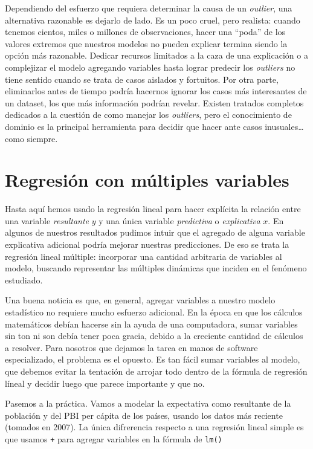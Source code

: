 \documentclass[]{book}
\begin{document}
Dependiendo del esfuerzo que requiera determinar la causa de un
\emph{outlier}, una alternativa razonable es dejarlo de lado. Es un poco
cruel, pero realista: cuando tenemos cientos, miles o millones de
observaciones, hacer una ``poda'' de los valores extremos que nuestros
modelos no pueden explicar termina siendo la opción más razonable.
Dedicar recursos limitados a la caza de una explicación o a complejizar
el modelo agregando variables hasta lograr predecir los \emph{outliers}
no tiene sentido cuando se trata de casos aislados y fortuitos. Por otra
parte, eliminarlos antes de tiempo podría hacernos ignorar los casos más
interesantes de un dataset, los que más información podrían revelar.
Existen tratados completos dedicados a la cuestión de como manejar los
\emph{outliers}, pero el conocimiento de dominio es la principal
herramienta para decidir que hacer ante casos inusuales\ldots{} como
siempre.

\section{Regresión con múltiples
variables}\label{regresion-con-multiples-variables}

Hasta aquí hemos usado la regresión lineal para hacer explícita la
relación entre una variable \emph{resultante} \(y\) y una única variable
\emph{predictiva} o \emph{explicativa} \(x\). En algunos de nuestros
resultados pudimos intuir que el agregado de alguna variable explicativa
adicional podría mejorar nuestras predicciones. De eso se trata la
regresión lineal múltiple: incorporar una cantidad arbitraria de
variables al modelo, buscando representar las múltiples dinámicas que
inciden en el fenómeno estudiado.

Una buena noticia es que, en general, agregar variables a nuestro modelo
estadístico no requiere mucho esfuerzo adicional. En la época en que los
cálculos matemáticos debían hacerse sin la ayuda de una computadora,
sumar variables sin ton ni son debía tener poca gracia, debido a la
creciente cantidad de cálculos a resolver. Para nosotros que dejamos la
tarea en manos de software especializado, el problema es el opuesto. Es
tan fácil sumar variables al modelo, que debemos evitar la tentación de
arrojar todo dentro de la fórmula de regresión líneal y decidir luego
que parece importante y que no.

Pasemos a la práctica. Vamos a modelar la expectativa como resultante de
la población y del PBI per cápita de los países, usando los datos más
reciente (tomados en 2007). La única difrerencia respecto a una
regresión lineal simple es que usamos \texttt{+} para agregar variables
en la fórmula de \texttt{lm()}
\end{document}
